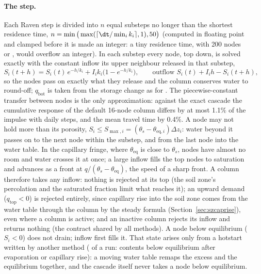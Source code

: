 \paragraph{The step.} Each Raven step is divided into $n$ equal substeps no longer than the shortest residence time,
$n=\min\big(\max(\lceil\dt/\min_ik_i\rceil,1),50\big)$ (computed in floating point and clamped before it is made an
integer: a tiny residence time, with 200 nodes or , would overflow an integer). In
each substep every node, top down, is solved exactly with the constant inflow its upper neighbour released in that
substep,
\begin{equation}
S_i(t+h)=S_i(t)\,e^{-h/k_i}+I_ik_i\big(1-e^{-h/k_i}\big),\qquad \text{outflow } S_i(t)+I_ih-S_i(t+h),
\end{equation}
so the nodes pass on exactly what they release and the column conserves water to round-off; $q_{\mathrm{bot}}$ is taken
from the storage change as for . The piecewise-constant transfer between nodes is the only approximation:
against the exact cascade the cumulative response of the default 16-node column differs by at most 1.1\% of the
impulse with daily steps, and the mean travel time by 0.4\%.
A node may not hold more than its porosity, $S_i\le S_{\max,i}=(\theta_s-\theta_{\mathrm{eq},i})\Delta z_i$: water beyond
it passes on to the next node within the substep, and from the last node into the water table. In the capillary
fringe, where $\theta_{\mathrm{eq}}$ is close to $\theta_s$, nodes have almost no room and water crosses it at once; a
large inflow fills the top nodes to saturation and advances as a front at $q/(\theta_s-\theta_{\mathrm{eq}})$, the speed
of a sharp front. A column therefore takes any inflow: nothing is rejected at its top (the soil zone's percolation and
the saturated fraction limit what reaches it); an upward demand ($q_{\mathrm{top}}<0$) is rejected entirely, since
capillary rise into the soil zone comes from the water table through the column by the steady formula
(Section~\ref{sec:szcaprise}), even where a column is active; and an inactive column rejects its inflow and returns
nothing (the contract shared by all methods). A node below equilibrium ($S_i<0$) does not drain; inflow first fills
it. That state arises only from a hotstart written by another method ( of a  run:
contents below equilibrium after evaporation or capillary rise): a moving water table remaps the excess and the
equilibrium together, and the cascade itself never takes a node below equilibrium.

